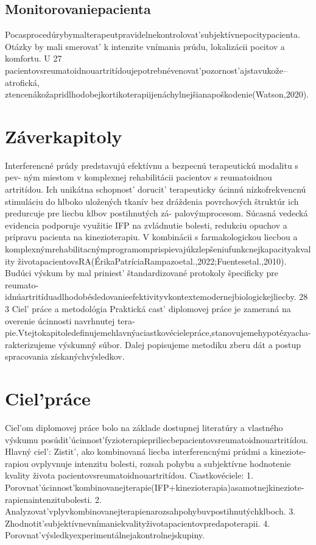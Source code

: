 \subsection{Monitorovaniepacienta}

Pocasprocedúrybymalterapeutpravidelnekontrolovat’subjektívnepocitypacienta. Otázky by mali smerovat’ k intenzite vnímania prúdu, lokalizácii pocitov a komfortu. U 27 pacientovsreumatoidnouartritídoujepotrebnévenovat’pozornost’ajstavukože--atrofická, ztencenákožapridlhodobejkortikoterapiijenáchylnejšianapoškodenie(Watson,2020).


\section{Záverkapitoly}

Interferencné prúdy predstavujú efektívnu a bezpecnú terapeutickú modalitu s pev- ným miestom v komplexnej rehabilitácii pacientov s reumatoidnou artritídou. Ich unikátna schopnost’ dorucit’ terapeuticky úcinnú nízkofrekvencnú stimuláciu do hlboko uložených tkanív bez dráždenia povrchových štruktúr ich predurcuje pre liecbu klbov postihnutých zá- palovýmprocesom. Súcasná vedecká evidencia podporuje využitie IFP na zvládnutie bolesti, redukciu opuchov a prípravu pacienta na kinezioterapiu. V kombinácii s farmakologickou liecbou a komplexnýmrehabilitacnýmprogramomprispievajúkzlepšeniufunkcnejkapacityakvality životapacientovsRA(ÉrikaPatríciaRampazoetal.,2022;Fuentesetal.,2010). Budúci výskum by mal priniest’ štandardizované protokoly špecificky pre reumato- idnúartritíduadlhodobésledovanieefektivityvkontextemodernejbiologickejliecby. 28 3 Ciel’ práce a metodológia Praktická cast’ diplomovej práce je zameraná na overenie úcinnosti navrhnutej tera- pie.Vtejtokapitoledefinujemehlavnýaciastkovécielepráce,stanovujemehypotézyacha- rakterizujeme výskumný súbor. Dalej popisujeme metodiku zberu dát a postup spracovania získanýchvýsledkov.


\section{Ciel’práce}

Ciel’om diplomovej práce bolo na základe dostupnej literatúry a vlastného výskumu posúdit’úcinnost’fyzioterapiepriliecbepacientovsreumatoidnouartritídou. Hlavný ciel’: Zistit’, ako kombinovaná liecba interferencnými prúdmi a kineziote- rapiou ovplyvnuje intenzitu bolesti, rozsah pohybu a subjektívne hodnotenie kvality života pacientovsreumatoidnouartritídou. Ciastkovéciele: 1. Porovnat’úcinnost’kombinovanejterapie(IFP+kinezioterapia)asamotnejkineziote- rapienaintenzitubolesti. 2. Analyzovat’vplyvkombinovanejterapienarozsahpohybuvpostihnutýchklboch. 3. Zhodnotit’subjektívnevnímaniekvalityživotapacientovpredapoterapii. 4. Porovnat’výsledkyexperimentálnejakontrolnejskupiny.


